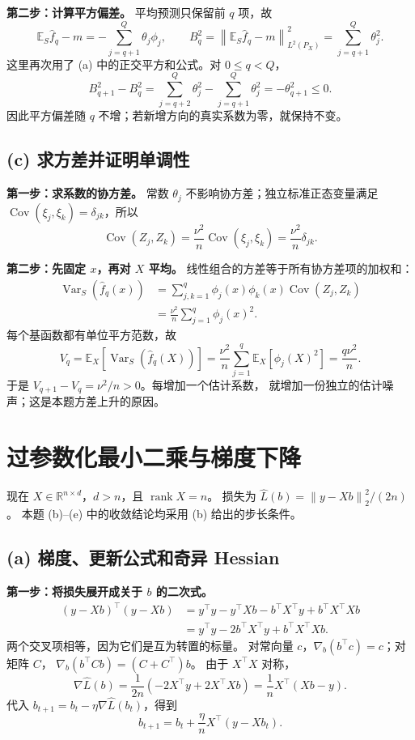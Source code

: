 \documentclass[UTF8,a4paper,11pt,fontset=fandol]{ctexart}
\newcommand{\E}{\mathbb E}
\newcommand{\R}{\mathbb R}
\newcommand{\norm}[1]{\left\lVert#1\right\rVert}
\DeclareMathOperator{\Var}{Var}
\DeclareMathOperator{\Cov}{Cov}
\DeclareMathOperator{\rank}{rank}
\begin{document}
\textbf{第二步：计算平方偏差。}
平均预测只保留前 $q$ 项，故
\[
 \E_S\widehat f_q-m=-\sum_{j=q+1}^Q\theta_j\phi_j,
 \qquad B_q^2=\norm{\E_S\widehat f_q-m}_{L^2(P_X)}^2
 =\sum_{j=q+1}^Q\theta_j^2.
\]
这里再次用了 (a) 中的正交平方和公式。对 $0\leq q<Q$，
\[
 B_{q+1}^2-B_q^2
 =\sum_{j=q+2}^Q\theta_j^2-\sum_{j=q+1}^Q\theta_j^2
 =-\theta_{q+1}^2\leq0.
\]
因此平方偏差随 $q$ 不增；若新增方向的真实系数为零，就保持不变。

\subsection*{(c) 求方差并证明单调性}
\textbf{第一步：求系数的协方差。}
常数 $\theta_j$ 不影响协方差；独立标准正态变量满足
$\Cov(\xi_j,\xi_k)=\delta_{jk}$，所以
\[
 \Cov(Z_j,Z_k)=\frac{\nu^2}{n}\Cov(\xi_j,\xi_k)
 =\frac{\nu^2}{n}\delta_{jk}.
\]

\textbf{第二步：先固定 $x$，再对 $X$ 平均。}
线性组合的方差等于所有协方差项的加权和：
\begin{align*}
 \Var_S(\widehat f_q(x))
 &=\sum_{j,k=1}^q\phi_j(x)\phi_k(x)\Cov(Z_j,Z_k)\\
 &=\frac{\nu^2}{n}\sum_{j=1}^q\phi_j(x)^2.
\end{align*}
每个基函数都有单位平方范数，故
\[
 V_q=\E_X[\Var_S(\widehat f_q(X))]
 =\frac{\nu^2}{n}\sum_{j=1}^q\E_X[\phi_j(X)^2]
 =\boxed{\frac{q\nu^2}{n}}.
\]
于是 $V_{q+1}-V_q=\nu^2/n>0$。每增加一个估计系数，
就增加一份独立的估计噪声；这是本题方差上升的原因。

\section{过参数化最小二乘与梯度下降}
现在 $X\in\R^{n\times d}$，$d>n$，且 $\rank X=n$。
损失为 $\widehat L(b)=\norm{y-Xb}_2^2/(2n)$。
本题 (b)--(e) 中的收敛结论均采用 (b) 给出的步长条件。

\subsection*{(a) 梯度、更新公式和奇异 Hessian}
\textbf{第一步：将损失展开成关于 $b$ 的二次式。}
\begin{align*}
 (y-Xb)^\top(y-Xb)
 &=y^\top y-y^\top Xb-b^\top X^\top y+b^\top X^\top Xb\\
 &=y^\top y-2b^\top X^\top y+b^\top X^\top Xb.
\end{align*}
两个交叉项相等，因为它们是互为转置的标量。
对常向量 $c$，$\nabla_b(b^\top c)=c$；对矩阵 $C$，
$\nabla_b(b^\top Cb)=(C+C^\top)b$。
由于 $X^\top X$ 对称，
\[
 \nabla\widehat L(b)
 =\frac1{2n}(-2X^\top y+2X^\top Xb)
 =\frac1nX^\top(Xb-y).
\]
代入 $b_{t+1}=b_t-\eta\nabla\widehat L(b_t)$，得到
\[
 \boxed{b_{t+1}=b_t+\frac\eta n X^\top(y-Xb_t).}
\]
\end{document}
